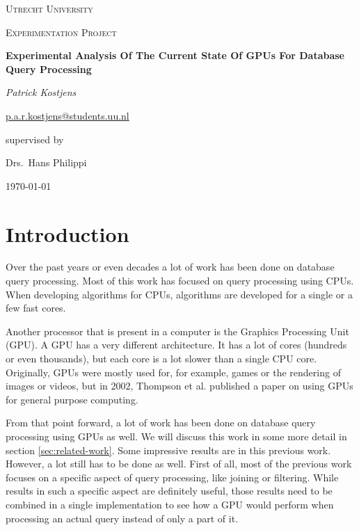 \documentclass[a4paper,titlepage]{article}
\begin{document}
\begin{titlepage}
	\centering
	{\scshape\LARGE Utrecht University \par}
	\vspace{1cm}
	{\scshape\Large Experimentation Project \par}
	\vspace{1.5cm}
	{\huge\bfseries Experimental Analysis Of The Current State Of GPUs For Database Query Processing\par}
	\vspace{2cm}
	
	{\Large\itshape Patrick Kostjens \par}
	\href{mailto:p.a.r.kostjens@students.uu.nl}{p.a.r.kostjens@students.uu.nl}
	\vfill
	
	supervised by\par
	Drs.~Hans Philippi
	\vfill

	{\large \today\par}
\end{titlepage}

\begin{abstract}

\textbf{Keywords:} query processing, graphics processing unit, relational database, parallel processing, CUDA
\end{abstract}

\section{Introduction}
Over the past years or even decades a lot of work has been done on database query processing. Most of this work has focused on query processing using CPUs. When developing algorithms for CPUs, algorithms are developed for a single or a few fast cores. %

Another processor that is present in a computer is the Graphics Processing Unit (GPU). A GPU has a very different architecture. It has a lot of cores (hundreds or even thousands), but each core is a lot slower than a single CPU core. Originally, GPUs were mostly used for, for example, games or the rendering of images or videos, but in 2002, Thompson et al. \cite{thompson2002} published a paper on using GPUs for general purpose computing.

From that point forward, a lot of work has been done on database query processing using GPUs as well. We will discuss this work in some more detail in section \ref{sec:related-work}. Some impressive results are in this previous work. However, a lot still has to be done as well. First of all, most of the previous work focuses on a specific aspect of query processing, like joining or filtering. While results in such a specific aspect are definitely useful, those results need to be combined in a single implementation to see how a GPU would perform when processing an actual query instead of only a part of it.
\end{document}
